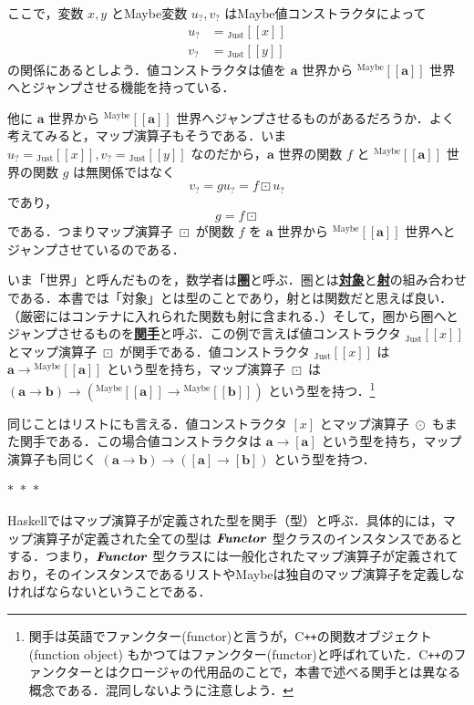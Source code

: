 \documentclass[a5paper,twoside,fleqn,draft]{jsbook}
\def\[{[\![}
\def\]{]\!]}
\newcommand{\separator}{\begin{center}$*$~$*$~$*$\end{center}}
\newcommand{\programminglanguage}[1]{\textsf{#1}}
\newcommand{\cxx}{\programminglanguage{C}\texttt{++}}
\newcommand{\haskell}{\programminglanguage{Haskell}}
\newcommand{\keyword}[1]{{\underline{\textbf{#1}}}}
\DeclareMathOperator{\mFuncArrow}{\rightarrow}
\DeclareMathOperator{\mMapList}{\odot}
\DeclareMathOperator{\mMapMaybe}{\boxdot}
\newcommand{\mType}[1]{\mathbf{#1}} %
\newcommand{\mA}{\mType{a}}
\newcommand{\mB}{\mType{b}}
\newcommand{\mTypeAssemble}[2]{{}^\mathrm{#1}\[\mType{#2}\]}
\newcommand{\mMaybeType}[1]{\mTypeAssemble{Maybe}{#1}}
\newcommand{\mValueConstructor}[1]{\mathrm{#1}}
\newcommand{\mValueWith}[2]{{}_\mValueConstructor{#1}\[#2\]}
\newcommand{\mJustWith}[1]{\mValueWith{Just}{#1}}
\newcommand{\mTypeClass}[1]{\textbf{\textit{#1}}}
\newcommand{\mFunctorTypeClass}{\mTypeClass{Functor}}
\newcommand{\mMaybe}[1]{{#1}_?}
\begin{document}
ここで，変数 $x,y$ とMaybe変数 $\mMaybe{u},\mMaybe{v}$ はMaybe値コンストラクタによって
\begin{align}
  \mMaybe{u}
  &=\mJustWith{x}\\
  \mMaybe{v}
  &=\mJustWith{y}
\end{align}
の関係にあるとしよう．値コンストラクタは値を $\mA$ 世界から $\mMaybeType{a}$ 世界へとジャンプさせる機能を持っている．

他に $\mA$ 世界から $\mMaybeType{a}$ 世界へジャンプさせるものがあるだろうか．よく考えてみると，マップ演算子もそうである．いま $\mMaybe{u}=\mJustWith{x},\mMaybe{v}=\mJustWith{y}$ なのだから，$\mA $ 世界の関数 $f$ と $\mMaybeType{a}$ 世界の関数 $g$ は無関係ではなく
\begin{equation}
  \mMaybe{v}
  =g\mMaybe{u}
  =f\mMapMaybe\mMaybe{u}
\end{equation}
であり，
\begin{equation}
  g
  =f\mMapMaybe
\end{equation}
である．つまりマップ演算子 $\mMapMaybe$ が関数 $f$ を $\mA$ 世界から $\mMaybeType{a}$ 世界へとジャンプさせているのである．

いま「世界」と呼んだものを，数学者は\keyword{圏}と呼ぶ．圏とは\keyword{対象}と\keyword{射}の組み合わせである．本書では「対象」とは型のことであり，射とは関数だと思えば良い．（厳密にはコンテナに入れられた関数も射に含まれる．）そして，圏から圏へとジャンプさせるものを\keyword{関手}と呼ぶ．この例で言えば値コンストラクタ $\mJustWith{x}$ とマップ演算子 $\mMapMaybe$ が関手である．値コンストラクタ $\mJustWith{x}$ は $\mA\mFuncArrow\mMaybeType{a}$ という型を持ち，マップ演算子 $\mMapMaybe$ は $(\mA\mFuncArrow\mB)\mFuncArrow(\mMaybeType{a}\mFuncArrow\mMaybeType{b})$ という型を持つ．\footnote{関手は英語でファンクター(functor)と言うが，\cxx の関数オブジェクト (function object) もかつてはファンクター(functor)と呼ばれていた．\cxx のファンクターとはクロージャの代用品のことで，本書で述べる関手とは異なる概念である．混同しないように注意しよう．}

同じことはリストにも言える．値コンストラクタ $[x]$ とマップ演算子 $\mMapList$ もまた関手である．この場合値コンストラクタは $\mA\mFuncArrow[\mA]$ という型を持ち，マップ演算子も同じく $(\mA\mFuncArrow\mB)\mFuncArrow([\mA]\mFuncArrow[\mB])$ という型を持つ．

\separator

\haskell ではマップ演算子が定義された型を関手（型）と呼ぶ．具体的には，マップ演算子が定義された全ての型は $\mFunctorTypeClass$ 型クラスのインスタンスであるとする．つまり，$\mFunctorTypeClass$ 型クラスには一般化されたマップ演算子が定義されており，そのインスタンスであるリストやMaybeは独自のマップ演算子を定義しなければならないということである．
\end{document}

